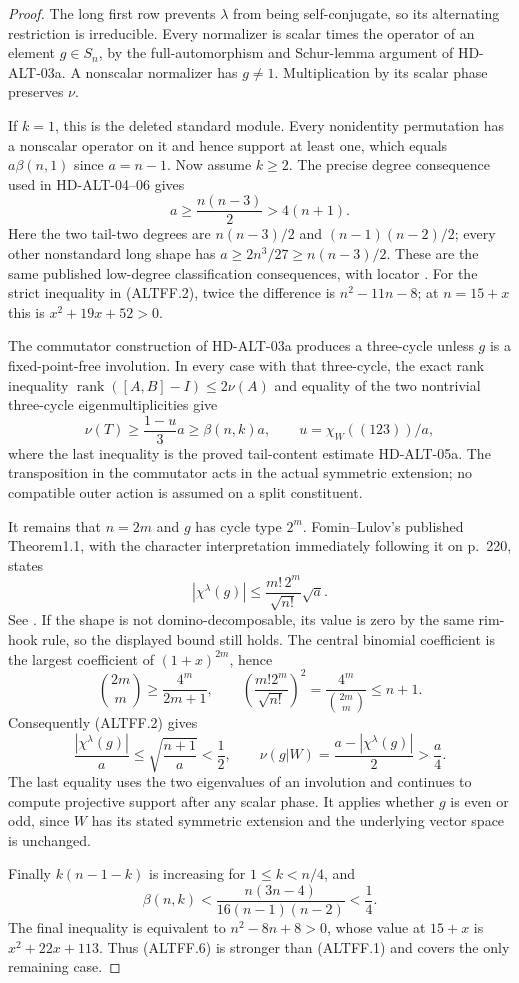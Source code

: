 \begin{proof}
The long first row prevents $\lambda$ from being self-conjugate, so its
alternating restriction is irreducible. Every normalizer is scalar
times the operator of an element $g\in S_n$, by the full-automorphism
and Schur-lemma argument of HD-ALT-03a. A nonscalar normalizer has
$g\ne1$. Multiplication by its scalar phase preserves $\nu$.

If $k=1$, this is the deleted standard module. Every nonidentity
permutation has a nonscalar operator on it and hence support at least
one, which equals $a\beta(n,1)$ since $a=n-1$.
Now assume $k\ge2$. The precise degree consequence used in
HD-ALT-04--06 gives
\[
                         a\ge\frac{n(n-3)}2>4(n+1).
 \tag{ALTFF.2}
\]
Here the two tail-two degrees are $n(n-3)/2$ and
$(n-1)(n-2)/2$; every other nonstandard long shape has
$a\ge2n^3/27\ge n(n-3)/2$. These are the same published
low-degree classification consequences, with locator
\cite[proof of Theorem~9.7, p.~312]{HD:GKT2019}.
For the strict inequality in (ALTFF.2), twice the difference is
$n^2-11n-8$; at $n=15+x$ this is $x^2+19x+52>0$.

The commutator construction of HD-ALT-03a produces a three-cycle
unless $g$ is a fixed-point-free involution. In every case with that
three-cycle, the exact rank inequality
$\operatorname{rank}([A,B]-I)\le2\nu(A)$ and equality of the two
nontrivial three-cycle eigenmultiplicities give
\[
 \nu(T)\ge\frac{1-u}{3}a\ge\beta(n,k)a,
 \qquad u=\chi_W((123))/a,
 \tag{ALTFF.3}
\]
where the last inequality is the proved tail-content estimate
HD-ALT-05a. The transposition in the commutator acts in the actual symmetric
extension; no compatible outer action is assumed on a split constituent.

It remains that $n=2m$ and $g$ has cycle type $2^m$.
Fomin--Lulov's published Theorem1.1, with the character interpretation
immediately following it on p.~220, states
\[
 |\chi^{\lambda}(g)|\le
       \frac{m!\,2^m}{\sqrt{n!}}\sqrt a.
 \tag{ALTFF.4}
\]
See \cite[Theorem~1.1 and following character equality, p.~220;
complete proof, pp.~221--223]{HD:FominLulov1995}.
If the shape is not domino-decomposable, its value is zero by the
same rim-hook rule, so the displayed bound still holds.
The central binomial coefficient is the largest coefficient of
$(1+x)^{2m}$, hence
\[
 \binom{2m}{m}\ge\frac{4^m}{2m+1},\qquad
 \left(\frac{m!2^m}{\sqrt{n!}}\right)^2
     =\frac{4^m}{\binom{2m}{m}}\le n+1.
 \tag{ALTFF.5}
\]
Consequently (ALTFF.2) gives
\[
 \frac{|\chi^\lambda(g)|}{a}
      \le\sqrt{\frac{n+1}{a}}<\frac12,
 \qquad
 \nu(g|W)=\frac{a-|\chi^\lambda(g)|}{2}>\frac a4.
 \tag{ALTFF.6}
\]
The last equality uses the two eigenvalues of an involution and
continues to compute projective support after any scalar phase.
It applies whether $g$ is even or odd, since $W$ has its stated
symmetric extension and the underlying vector space is unchanged.

Finally $k(n-1-k)$ is increasing for $1\le k<n/4$, and
\[
 \beta(n,k)<\frac{n(3n-4)}{16(n-1)(n-2)}<\frac14.
 \tag{ALTFF.7}
\]
The final inequality is equivalent to $n^2-8n+8>0$, whose value
at $15+x$ is $x^2+22x+113$. Thus (ALTFF.6) is stronger than
(ALTFF.1) and covers the only remaining case.
\end{proof}

